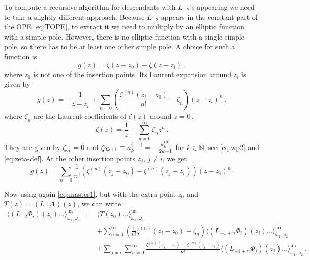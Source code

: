 \documentclass[11pt,a4paper]{article}
\numberwithin{equation}{section}
\newcommand{\one}{\mathbf{1}} %
\begin{document}
To compute a recursive algorithm for descendants with $L_{-2}$'s appearing we need to take a slightly different approach. Because $L_{-2}$ appears in the constant part of the OPE \eqref{eq:TOPE}, to extract it we need to multiply by an elliptic function with a simple pole. However, there is no elliptic function with a single simple pole, so there has to be at least one other simple pole. A choice for such a function is
%
\begin{equation}
    g(z) = \zeta(z-z_0)-\zeta(z-z_i)\,,
\end{equation}
%
where $z_0$ is not one of the insertion points. Its Laurent expansion around $z_i$ is given by 
%
\begin{equation}
    g(z) = -\frac{1}{z-z_i} + \sum_{n=0}\left(\frac{\zeta^{(n)}(z_i-z_0)}{n!} - \zeta_n\right) (z-z_i)^n\,,
\end{equation}
%
where $\zeta_n$ are the Laurent coefficients of $\zeta(z)$ around $z=0$\,. 
%
\begin{equation}
    \zeta(z) = \frac1z + \sum_{n=0}^\infty \zeta_n z^n ~.
\end{equation}
%
They are given by $\zeta_{2k}=0$ and $\zeta_{2k+1}\equiv a_k^{\small(-1)}=-\frac{a_k^{(0)}}{2k+1}$ for $k\in\mathbb{N}$, see \eqref{eq:wp2} and \eqref{eq:zeta-def}.
At the other insertion points $z_j$, $j\neq i$, we get
%
\begin{equation}
    g(z) =  \sum_{n=0}\frac{1}{n!}\left(\zeta^{(n)}(z_j-z_0) - \zeta^{(n)}(z_j-z_i)\right) (z-z_i)^n\,.
\end{equation}

\noindent
Now using again \eqref{eq:master1}, but with the extra point $z_0$ and $T(z) = (L_{-2}\one)(z)$, we can write
%
\begin{align}
    \big\langle (L_{-2}\Phi_i)(z_i)\dots\big\rangle_{\omega_1,\omega_2}^\mathrm{un} = ~& \big\langle T(z_0) \dots\big\rangle_{\omega_1,\omega_2}^\mathrm{un} \nonumber\\
    &+ \sum_{n=0}^\infty \left(\frac{1}{n!}\zeta^{(n)}\!(z_i-z_0) - \zeta_n\right) 
    \big\langle (L_{-1+n}\Phi_i)(z_i)\dots\big\rangle_{\omega_1,\omega_2}^\mathrm{un}
   \\
& + \sum_{j\neq i} \sum_{n=0}^\infty \frac{\zeta^{(n)}\!(z_j-z_0) - \zeta^{(n)}\!(z_j-z_i)}{n!} 
\big\langle (L_{-1+n}\Phi_j)(z_j)\dots\big\rangle_{\omega_1,\omega_2}^\mathrm{un}\,.\nonumber 
\end{align}
\end{document}

